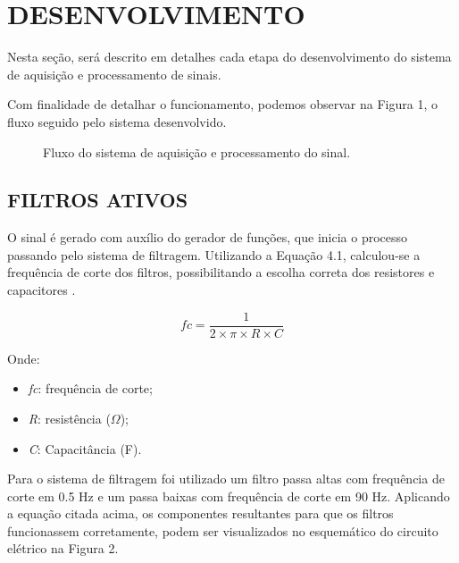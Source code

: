 \chapter{DESENVOLVIMENTO}
Nesta seção, será descrito em detalhes cada etapa do desenvolvimento do sistema de aquisição e processamento de sinais. 

Com finalidade de detalhar o funcionamento, podemos observar na Figura 1, o fluxo seguido pelo sistema desenvolvido.

\begin{figure}[h] 
	\begin{center} 
		\begin{center}
			\changecaptionwidth 
			\captionwidth{15.6cm} %
			\caption{\label{fig_fot7}Fluxo do sistema de aquisição e processamento do sinal.}
		\end{center}
	\end{center}
\end{figure} 

 

\section{FILTROS ATIVOS}
O sinal é gerado com auxílio do gerador de funções, que inicia o processo passando pelo sistema de filtragem. Utilizando a Equação 4.1, calculou-se a frequência de corte dos filtros, possibilitando a escolha correta dos resistores e capacitores \cite{Geovani3}.

\begin{equation}
	fc = \frac {1}{2 \times \pi \times R \times C}
\end{equation}

Onde:
\begin{itemize}
	\item \textit{fc}: frequência de corte;
	\item \textit{R}: resistência ($\Omega$);
	\item \textit{C}: Capacitância (F).
\end{itemize}
 
Para o sistema de filtragem foi utilizado um filtro passa altas com frequência de corte em 0.5 Hz e um passa baixas com frequência de corte em 90 Hz. Aplicando a equação citada acima, os componentes resultantes para que os filtros funcionassem corretamente, podem ser visualizados no esquemático do circuito elétrico na Figura 2.

